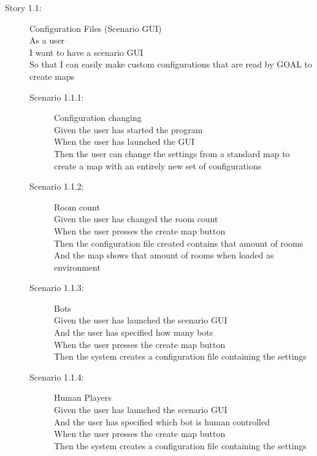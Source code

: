 \begin{description}
  \item[Story 1.1:] Configuration Files (Scenario GUI)\\
  As a user\\
  I want to have a scenario GUI\\
  So that I can easily make custom configurations that are read by GOAL to create maps

  \begin{description}
    \item[Scenario 1.1.1:] Configuration changing\\
    Given the user has started the program\\
    When the user has launched the GUI\\
    Then the user can change the settings from a standard map to create a map with an entirely new set of configurations
    
    \item[Scenario 1.1.2:] Room count\\
    Given the user has changed the room count\\
    When the user presses the create map button\\
    Then the configuration file created contains that amount of rooms\\
    And the map shows that amount of rooms when loaded as environment
    
    \item[Scenario 1.1.3:] Bots\\
    Given the user has launched the scenario GUI\\
    And the user has specified how many bots\\
    When the user presses the create map button\\
    Then the system creates a configuration file containing the settings

    \item[Scenario 1.1.4:] Human Players\\
    Given the user has launched the scenario GUI\\
    And the user has specified which bot is human controlled\\
    When the user presses the create map button\\
    Then the system creates a configuration file containing the settings
    

\end{description}
\end{description}
